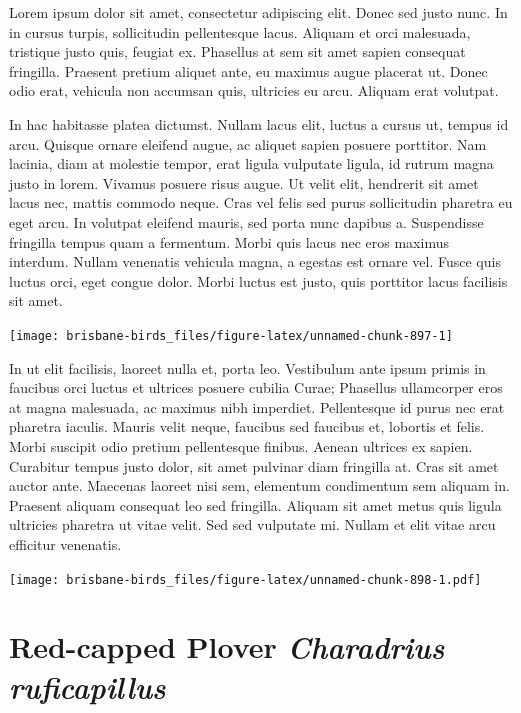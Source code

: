 \documentclass[]{book}
\let\origfigure\figure
\let\endorigfigure\endfigure
\renewenvironment{figure}[1][2] {
  \expandafter\origfigure\expandafter[H]
} {
  \endorigfigure
}
\begin{document}
Lorem ipsum dolor sit amet, consectetur adipiscing elit. Donec sed justo
nunc. In in cursus turpis, sollicitudin pellentesque lacus. Aliquam et
orci malesuada, tristique justo quis, feugiat ex. Phasellus at sem sit
amet sapien consequat fringilla. Praesent pretium aliquet ante, eu
maximus augue placerat ut. Donec odio erat, vehicula non accumsan quis,
ultricies eu arcu. Aliquam erat volutpat.

In hac habitasse platea dictumst. Nullam lacus elit, luctus a cursus ut,
tempus id arcu. Quisque ornare eleifend augue, ac aliquet sapien posuere
porttitor. Nam lacinia, diam at molestie tempor, erat ligula vulputate
ligula, id rutrum magna justo in lorem. Vivamus posuere risus augue. Ut
velit elit, hendrerit sit amet lacus nec, mattis commodo neque. Cras vel
felis sed purus sollicitudin pharetra eu eget arcu. In volutpat eleifend
mauris, sed porta nunc dapibus a. Suspendisse fringilla tempus quam a
fermentum. Morbi quis lacus nec eros maximus interdum. Nullam venenatis
vehicula magna, a egestas est ornare vel. Fusce quis luctus orci, eget
congue dolor. Morbi luctus est justo, quis porttitor lacus facilisis sit
amet.

\begin{figure}
\texttt{[image: brisbane-birds\_files/figure-latex/unnamed-chunk-897-1]} \caption{insert figure caption}\label{fig:unnamed-chunk-897}
\end{figure}

In ut elit facilisis, laoreet nulla et, porta leo. Vestibulum ante ipsum
primis in faucibus orci luctus et ultrices posuere cubilia Curae;
Phasellus ullamcorper eros at magna malesuada, ac maximus nibh
imperdiet. Pellentesque id purus nec erat pharetra iaculis. Mauris velit
neque, faucibus sed faucibus et, lobortis et felis. Morbi suscipit odio
pretium pellentesque finibus. Aenean ultrices ex sapien. Curabitur
tempus justo dolor, sit amet pulvinar diam fringilla at. Cras sit amet
auctor ante. Maecenas laoreet nisi sem, elementum condimentum sem
aliquam in. Praesent aliquam consequat leo sed fringilla. Aliquam sit
amet metus quis ligula ultricies pharetra ut vitae velit. Sed sed
vulputate mi. Nullam et elit vitae arcu efficitur venenatis.

\begin{figure}
\centering
\texttt{[image: brisbane-birds\_files/figure-latex/unnamed-chunk-898-1.pdf]}
\caption{\label{fig:unnamed-chunk-898}insert figure caption}
\end{figure}

\section{\texorpdfstring{Red-capped Plover \emph{Charadrius
ruficapillus}}{Red-capped Plover Charadrius ruficapillus}}\label{red-capped-plover-charadrius-ruficapillus}
\end{document}
